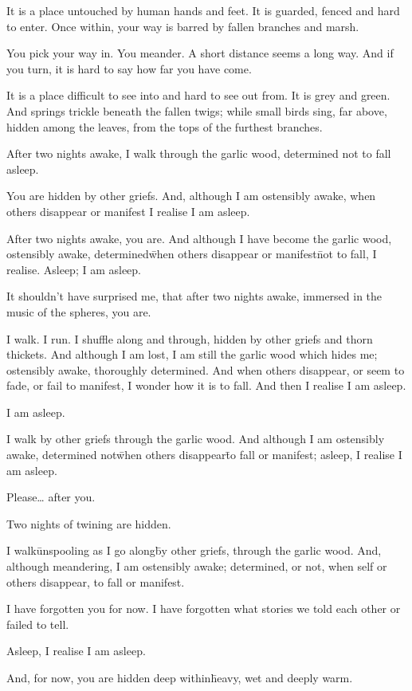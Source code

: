 



\prelude

It is a place untouched by human hands and feet. It is guarded, fenced and hard to enter. Once within, your way is barred by fallen branches and marsh.

You pick your way in. You meander. A short distance seems a long way. And if you turn, it is hard to say how far you have come.

It is a place difficult to see into and hard to see out from. It is grey and green. And springs trickle beneath the fallen twigs; while small birds sing, far above, hidden among the leaves, from the tops of the furthest branches.

\fugue

After two nights awake, I walk through the garlic wood, determined not to fall asleep.

You are hidden by other griefs. And, although I am ostensibly awake, when others disappear or manifest I realise I am asleep.

After two nights awake, you are. And although I have become the garlic wood, ostensibly awake, determined\=when others disappear or manifest\=not to fall, I realise. 
Asleep; I am asleep. 

It shouldn’t have surprised me, that after two nights awake, immersed in the music of the spheres, you are.

I walk. I run. I shuffle along and through, hidden by other griefs and thorn thickets. And although I am lost, I am still the garlic wood which hides me; ostensibly awake, thoroughly determined. And when others disappear, or seem to fade, or fail to manifest, I wonder how it is to fall. And then I realise I am asleep.

I am asleep.



I walk by other griefs through the garlic wood. And although I am ostensibly awake, determined not\=when others disappear\=to fall or manifest; asleep, I realise I am asleep.

Please… after you.

Two nights of twining are hidden.

I walk\=unspooling as I go along\=by other griefs, through the garlic wood. And, although meandering, I am ostensibly awake; determined, or not, when self or others disappear, to fall or manifest.

I have forgotten you for now. I have forgotten what stories we told each other or failed to tell.

Asleep, I realise I am asleep. 

And, for now, you are hidden deep within\=heavy, wet and deeply warm.

